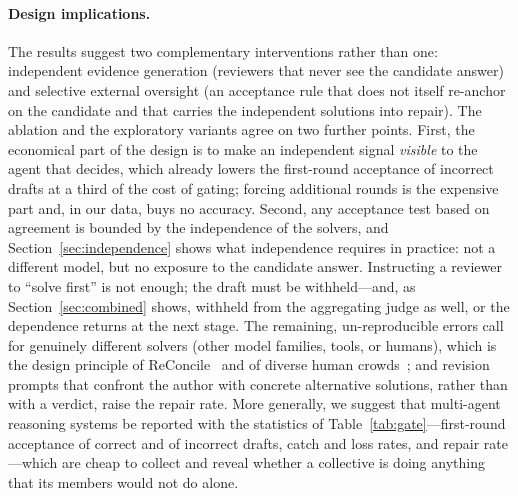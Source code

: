 \documentclass[manuscript, screen, review]{acmart}
\begin{document}
\paragraph{Design implications.}
The results suggest two complementary interventions rather than one: independent evidence generation (reviewers that never see the candidate answer) and selective external oversight (an acceptance rule that does not itself re-anchor on the candidate and that carries the independent solutions into repair).
The ablation and the exploratory variants agree on two further points.
First, the economical part of the design is to make an independent signal \emph{visible} to the agent that decides, which already lowers the first-round acceptance of incorrect drafts at a third of the cost of gating; forcing additional rounds is the expensive part and, in our data, buys no accuracy.
Second, any acceptance test based on agreement is bounded by the independence of the solvers, and Section~\ref{sec:independence} shows what independence requires in practice: not a different model, but no exposure to the candidate answer. Instructing a reviewer to ``solve first'' is not enough; the draft must be withheld---and, as Section~\ref{sec:combined} shows, withheld from the aggregating judge as well, or the dependence returns at the next stage.
The remaining, un-reproducible errors call for genuinely different solvers (other model families, tools, or humans), which is the design principle of ReConcile~\cite{chen2024reconcile} and of diverse human crowds~\cite{hong2004groups}; and revision prompts that confront the author with concrete alternative solutions, rather than with a verdict, raise the repair rate.
More generally, we suggest that multi-agent reasoning systems be reported with the statistics of Table~\ref{tab:gate}---first-round acceptance of correct and of incorrect drafts, catch and loss rates, and repair rate---which are cheap to collect and reveal whether a collective is doing anything that its members would not do alone.
\end{document}
